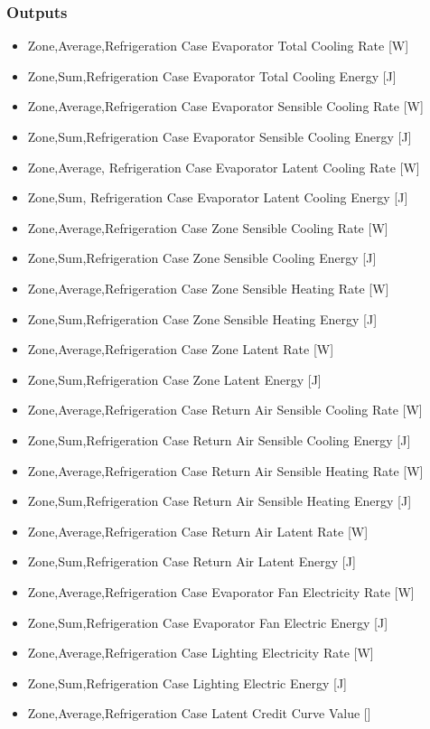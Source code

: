 \subsubsection{Outputs}\label{outputs-1-022}

\begin{itemize}
\item
  Zone,Average,Refrigeration Case Evaporator Total Cooling Rate {[}W{]}
\item
  Zone,Sum,Refrigeration Case Evaporator Total Cooling Energy {[}J{]}
\item
  Zone,Average,Refrigeration Case Evaporator Sensible Cooling Rate {[}W{]}
\item
  Zone,Sum,Refrigeration Case Evaporator Sensible Cooling Energy {[}J{]}
\item
  Zone,Average, Refrigeration Case Evaporator Latent Cooling Rate {[}W{]}
\item
  Zone,Sum, Refrigeration Case Evaporator Latent Cooling Energy {[}J{]}
\item
  Zone,Average,Refrigeration Case Zone Sensible Cooling Rate {[}W{]}
\item
  Zone,Sum,Refrigeration Case Zone Sensible Cooling Energy {[}J{]}
\item
  Zone,Average,Refrigeration Case Zone Sensible Heating Rate {[}W{]}
\item
  Zone,Sum,Refrigeration Case Zone Sensible Heating Energy {[}J{]}
\item
  Zone,Average,Refrigeration Case Zone Latent Rate {[}W{]}
\item
  Zone,Sum,Refrigeration Case Zone Latent Energy {[}J{]}
\item
  Zone,Average,Refrigeration Case Return Air Sensible Cooling Rate {[}W{]}
\item
  Zone,Sum,Refrigeration Case Return Air Sensible Cooling Energy {[}J{]}
\item
  Zone,Average,Refrigeration Case Return Air Sensible Heating Rate {[}W{]}
\item
  Zone,Sum,Refrigeration Case Return Air Sensible Heating Energy {[}J{]}
\item
  Zone,Average,Refrigeration Case Return Air Latent Rate {[}W{]}
\item
  Zone,Sum,Refrigeration Case Return Air Latent Energy {[}J{]}
\item
  Zone,Average,Refrigeration Case Evaporator Fan Electricity Rate {[}W{]}
\item
  Zone,Sum,Refrigeration Case Evaporator Fan Electric Energy {[}J{]}
\item
  Zone,Average,Refrigeration Case Lighting Electricity Rate {[}W{]}
\item
  Zone,Sum,Refrigeration Case Lighting Electric Energy {[}J{]}
\item
  Zone,Average,Refrigeration Case Latent Credit Curve Value {[]}
\end{itemize}

